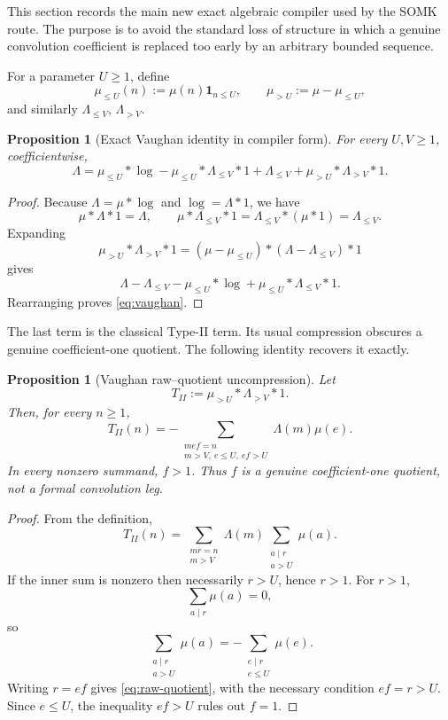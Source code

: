 \documentclass[11pt]{article}
\newtheorem{proposition}[theorem]{Proposition}
\theoremstyle{definition}
\theoremstyle{remark}
\newcommand{\1}{\mathbf 1}
\newcommand{\e}{\mathrm e}
\begin{document}
This section records the main new exact algebraic compiler used by the SOMK route.  The purpose is to avoid the standard loss of structure in which a genuine convolution coefficient is replaced too early by an arbitrary bounded sequence.

For a parameter \(U\ge1\), define
\[
 \mu_{\le U}(n):=\mu(n)\1_{n\le U},
 \qquad
 \mu_{>U}:=\mu-\mu_{\le U},
\]
and similarly \(\Lambda_{\le V}\), \(\Lambda_{>V}\).

\begin{proposition}[Exact Vaughan identity in compiler form]\label{prop:vaughan}
For every \(U,V\ge1\), coefficientwise,
\begin{equation}\label{eq:vaughan}
 \boxed{
 \Lambda
 =\mu_{\le U}*\log
 -\mu_{\le U}*\Lambda_{\le V}*1
 +\Lambda_{\le V}
 +\mu_{>U}*\Lambda_{>V}*1.}
\end{equation}
\end{proposition}

\begin{proof}
Because \(\Lambda=\mu*\log\) and \(\log=\Lambda*1\), we have
\[
 \mu*\Lambda*1=\Lambda,
 \qquad
 \mu*\Lambda_{\le V}*1=\Lambda_{\le V}*(\mu*1)=\Lambda_{\le V}.
\]
Expanding
\[
 \mu_{>U}*\Lambda_{>V}*1
 =(\mu-\mu_{\le U})*(\Lambda-\Lambda_{\le V})*1
\]
gives
\[
 \Lambda-\Lambda_{\le V}-\mu_{\le U}*\log
 +\mu_{\le U}*\Lambda_{\le V}*1.
\]
Rearranging proves \eqref{eq:vaughan}.
\end{proof}

The last term is the classical Type-II term.  Its usual compression obscures a genuine coefficient-one quotient.  The following identity recovers it exactly.

\begin{proposition}[Vaughan raw--quotient uncompression]\label{prop:raw-quotient}
Let
\[
 T_{II}:=\mu_{>U}*\Lambda_{>V}*1.
\]
Then, for every \(n\ge1\),
\begin{equation}\label{eq:raw-quotient}
 \boxed{
 T_{II}(n)
 =-
 \sum_{\substack{m e f=n\\m>V,\ e\le U,\ ef>U}}
 \Lambda(m)\mu(e).}
\end{equation}
In every nonzero summand, \(f>1\).  Thus \(f\) is a genuine coefficient-one quotient, not a formal convolution leg.
\end{proposition}

\begin{proof}
From the definition,
\[
 T_{II}(n)
 =\sum_{\substack{m r=n\\m>V}}
 \Lambda(m)
 \sum_{\substack{a\mid r\\a>U}}\mu(a).
\]
If the inner sum is nonzero then necessarily \(r>U\), hence \(r>1\).  For \(r>1\),
\[
 \sum_{a\mid r}\mu(a)=0,
\]
so
\[
 \sum_{\substack{a\mid r\\a>U}}\mu(a)
 =-\sum_{\substack{e\mid r\\e\le U}}\mu(e).
\]
Writing \(r=ef\) gives \eqref{eq:raw-quotient}, with the necessary condition \(ef=r>U\).  Since \(e\le U\), the inequality \(ef>U\) rules out \(f=1\).
\end{proof}
\end{document}
